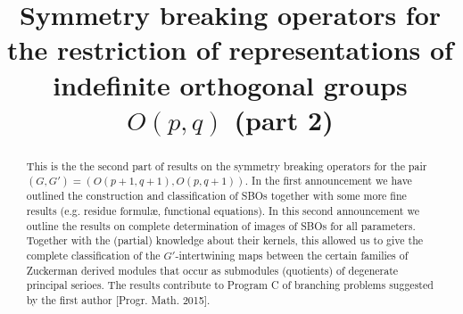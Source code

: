 \documentclass[reqno,12pt]{pja00} %
\newtheorem{theorem}{Theorem}[section]
\theoremstyle{definition}
\theoremstyle{exampstyle} \newtheorem{examp}[theorem]{Theorem}
\begin{document}
\title{Symmetry breaking operators for the restriction of representations of indefinite orthogonal groups $O(p,q)$ (part 2)}

  \maketitle
\begin{abstract}
This is the the second part of results on the symmetry breaking operators for the pair $(G, G') =(O(p+1, q+1), O(p,q+1))$.
In the first announcement we have outlined the construction and classification of SBOs together with some more fine results
(e.g. residue formul\ae, functional equations). In this second announcement we outline the results on complete determination of
images of SBOs for all parameters. Together with the (partial) knowledge about their kernels, this allowed us to give the complete classification
of the $G'$-intertwining maps between the certain families of Zuckerman derived modules that occur as submodules (quotients) of degenerate principal serioes.
The results contribute to Program C of branching problems suggested by the first author [Progr. Math. 2015].
\end{abstract}
\end{document}
